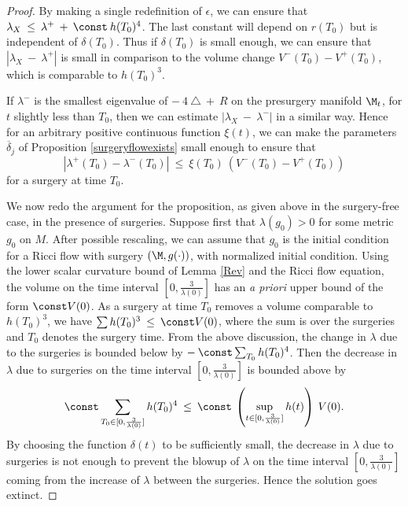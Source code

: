 \begin{proof}
By making a single redefinition of $\epsilon$,
we can ensure that
$\lambda_X \: \le \: \lambda^+ \: + \: \const \: h(T_0)^{4}$. The last
constant will depend on $r(T_0)$ but is independent of $\delta(T_0)$.
Thus if $\delta(T_0)$ is small enough, we can ensure that
$|\lambda_X \: - \: \lambda^+|$ is small in comparison to the
volume change $V^-(T_0) - V^+(T_0)$, which is comparable to $h(T_0)^3$.


If $\lambda^-$ is the smallest eigenvalue of $- \:4 \: \triangle \: + \: R$
on the presurgery manifold $\M_t$, for $t$ slightly less than $T_0$,
then we can estimate $|\lambda_X \: - \: \lambda^-|$ in a similar way.
Hence for an arbitrary positive continuous function $\xi(t)$,
we can make the parameters $\overline{\delta}_j$ of
Proposition \ref{surgeryflowexists} small enough to ensure that
\begin{equation}
|\lambda^+(T_0) - \lambda^-(T_0)| \: \le \: \xi(T_0) \:
(V^-(T_0) - V^+(T_0))
\end{equation}
for a surgery at time $T_0$.

We now redo the argument for the proposition, as given above in the
surgery-free case, in the presence of surgeries.
Suppose first that $\lambda(g_0) > 0$ for some metric $g_0$ on $M$.
After possible rescaling, we can assume that $g_0$ is the initial
condition for a Ricci flow with surgery $(\M, g(\cdot))$, with normalized initial condition.
Using the lower scalar curvature bound of Lemma \ref{Rev} and the Ricci
flow equation,
the volume on the time interval $[0, \frac{3}{\lambda(0)}]$ has an {\it a priori} upper
bound of the form $\const V(0)$. As a surgery at time $T_0$ removes a
volume comparable to $h(T_0)^3$, we have
$\sum h(T_0)^3 \: \le \: \const V(0)$, where the sum is over the
surgeries and $T_0$ denotes the
surgery time.  From the above discussion,
the change in $\lambda$ due to the
surgeries is bounded below by $-\: \const \sum_{T_0} h(T_0)^4$.
Then the decrease in $\lambda$ due to surgeries on the time interval
$[0, \frac{3}{\lambda(0)}]$ is bounded above by
\begin{equation}
\const \sum_{T_0 \in [0, \frac{3}{\lambda(0)}]} h(T_0)^4 \: \le \:  \const \:
\left( \sup_{t \in [0, \frac{3}{\lambda(0)}]} h(t) \right) \: V(0).
\end{equation}
By choosing the function $\delta(t)$ to be sufficiently small,
the decrease in $\lambda$ due to surgeries
is not enough to prevent the blowup of $\lambda$ on the time
interval $[0, \frac{3}{\lambda(0)}]$ coming from the increase of
$\lambda$ between the surgeries. Hence the solution goes extinct.


\end{proof}
